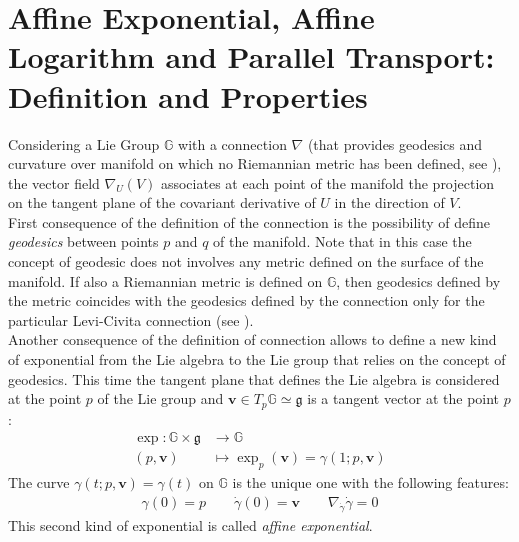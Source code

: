 %
%


\section{Affine Exponential, Affine Logarithm and Parallel Transport: Definition and Properties}\label{se:parallel_transport}

Considering a Lie Group $\mathbb{G}$ with a connection $\nabla$ (that provides geodesics and curvature over manifold on which no Riemannian metric has been defined, see \cite{do1992riemannian}), the vector field $\nabla_{U}(V)$ associates at each point of the manifold the projection on the tangent plane of the covariant derivative of $U$ in the direction of $V$. \\

First consequence of the definition of the connection is the possibility of define \emph{geodesics} between points $p$ and $q$ of the manifold. 
Note that in this case the concept of geodesic does not involves any metric defined on the surface of the manifold. If also a Riemannian metric is defined on $\mathbb{G} $, then geodesics defined by the metric coincides with the geodesics defined by the connection only for the particular Levi-Civita connection (see \cite{do1992riemannian}).\\

Another consequence of the definition of connection allows to define a new kind of exponential from the Lie algebra to the Lie group that relies on the concept of geodesics. This time the tangent plane that defines the Lie algebra is considered at the point $p$ of the Lie group and $\mathbf{v} \in T_{p}\mathbb{G}\simeq \mathfrak{g}$ is a tangent vector at the point $p$: 
\begin{align*}
\exp :  \mathbb{G}  \times \mathfrak{g}     &\longrightarrow \mathbb{G}  
\\ 
(p,\mathbf{v}) &\longmapsto \exp_{p}(\mathbf{v})  = \gamma(1; p,\mathbf{v})
\end{align*}
The curve $\gamma(t;p,\mathbf{v}) = \gamma(t)$ on $\mathbb{G}$ is the unique one with the following features:  
\begin{align*}
\gamma(0) = p\qquad  \dot{\gamma}(0) =  \mathbf{v} \qquad \nabla_{\dot{\gamma}}\dot{\gamma} = 0 
\end{align*}
This second kind of exponential is called \emph{affine exponential}.\\

